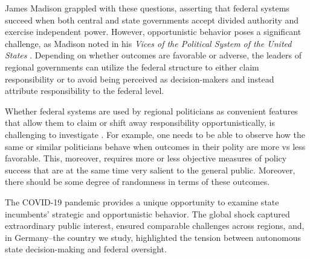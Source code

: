 \documentclass[authoryear,12pt, 3p]{elsarticle}
\theoremstyle{break}
\begin{document}
James Madison grappled with these questions, asserting that federal systems succeed when both central and state governments accept divided authority and exercise independent power. However, opportunistic behavior poses a significant challenge, as Madison noted in his \textit{Vices of the Political System of the United States} \citep{Madison1787}. Depending on whether outcomes are favorable or adverse, the leaders of regional governments can utilize the federal structure to either claim responsibility or to avoid being perceived as decision-makers and instead attribute responsibility to the federal level.

Whether federal systems are used by regional politicians as convenient features that allow them to claim or shift away responsibility opportunistically, is challenging to investigate \citep{Agrawal2022}. For example, one needs to be able to observe how the same or similar politicians behave when outcomes in their polity are more vs less favorable. This, moreover, requires more or less objective measures of policy success that are at the same time very salient to the general public. Moreover, there should be some degree of randomness in terms of these outcomes. 

The COVID-19 pandemic provides a unique opportunity to examine state incumbents' strategic and opportunistic behavior. The global shock captured extraordinary public interest, ensured comparable challenges across regions, and, in Germany--the country we study, highlighted the tension between autonomous state decision-making and federal oversight.
\end{document}
